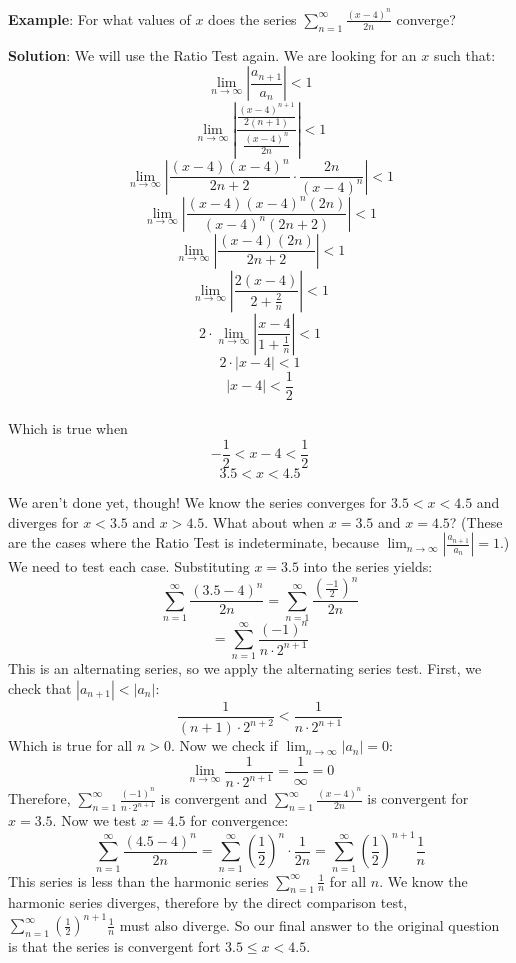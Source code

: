 \textbf{Example}: For what values of $x$ does the series $\sum_{n=1}^\infty 
\frac{(x-4)^n}{2n}$ converge?

\textbf{Solution}: We will use the Ratio Test again. We are looking for an $x$ 
such that:
$$\lim_{n \to \infty} \left| \frac{a_{n+1}}{a_n} \right| < 1$$
$$\lim_{n \to \infty} \left| \frac{\frac{(x-4)^{n+1}}{2(n+1)}}{\frac{(x-4)^n}{
2n}} \right| < 1$$
$$\lim_{n \to \infty} \left| \frac{(x-4)(x-4)^n}{2n + 2} \cdot \frac{2n}{(x-4)^
n} \right| < 1$$
$$\lim_{n \to \infty} \left| \frac{(x-4)(x-4)^n(2n)}{(x-4)^n(2n+2)} \right| < 
1$$
$$\lim_{n \to \infty} \left| \frac{(x-4)(2n)}{2n + 2} \right| < 1$$
$$\lim_{n \to \infty} \left| \frac{2(x-4)}{2 + \frac{2}{n}} \right| < 1$$
$$2 \cdot \lim_{n \to \infty} \left| \frac{x-4}{1+ \frac{1}{n}} \right| < 1$$
$$2 \cdot \left| x-4 \right| < 1$$
$$\left| x-4 \right| < \frac{1}{2}$$\\
Which is true when 
$$-\frac{1}{2} < x-4 < \frac{1}{2}$$
$$3.5 < x < 4.5$$

We aren't done yet, though! We know the series converges for $3.5 < x < 4.5$ 
and diverges for $x < 3.5$ and $x > 4.5$. What about when $x = 3.5$ and $x = 
4.5$? (These are the cases where the Ratio Test is indeterminate, because 
$\lim_{n \to \infty} \left| \frac{a_{n+1}}{a_n} \right| = 1$.) We need to test 
each case. Substituting $x = 3.5$ into the series yields:
$$\sum_{n=1}^\infty \frac{(3.5-4)^n}{2n} = \sum_{n=1}^\infty \frac{\left( 
\frac{-1}{2} \right)^n}{2n}$$
$$= \sum_{n=1}^\infty \frac{(-1)^n}{n \cdot 2^{n+1}}$$
This is an alternating series, so we apply the alternating series test. First, 
we check that $|a_{n+1}| < |a_n|$:
$$\frac{1}{(n+1) \cdot 2^{n+2}}  < \frac{1}{n \cdot 2^{n+1}}$$
Which is true for all $n > 0$. Now we check if $\lim_{n \to \infty} |a_n| = 0$:
$$\lim_{n \to \infty} \frac{1}{n \cdot 2^{n+1}} = \frac{1}{\infty} = 0$$
Therefore, $\sum_{n=1}^\infty \frac{(-1)^n}{n \cdot 2^{n+1}}$ is convergent 
and $\sum_{n=1}^\infty \frac{(x-4)^n}{2n}$ is convergent for $x = 3.5$. Now we 
test $x=4.5$ for convergence:
$$\sum_{n=1}^\infty \frac{(4.5-4)^n}{2n} = \sum_{n=1}^\infty \left( 
\frac{1}{2} \right)^n \cdot \frac{1}{2n} = \sum_{n=1}^\infty \left( 
\frac{1}{2} \right)^{n+1} \frac{1}{n}$$
This series is less than the harmonic series $\sum_{n=1}^\infty \frac{1}{n}$ 
for all $n$. We know the harmonic series diverges, therefore by the direct 
comparison test, $\sum_{n=1}^\infty \left( \frac{1}{2} \right)^{n+1} 
\frac{1}{n}$ must also diverge. So our final answer to the original question 
is that the series is convergent fort $3.5 \leq x < 4.5$. 

